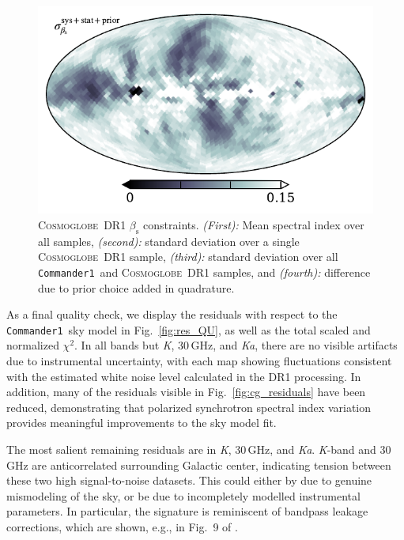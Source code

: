 \documentclass[twocolumn]{../../common/aa}
\def\commanderone{\texttt{Commander1}}
\newcommand{\cosmoglobe}{\textsc{Cosmoglobe}}
\newcommand{\K}[0]{\textit K}
\newcommand{\Ka}[0]{\textit{Ka}}
\begin{document}
\begin{figure}
	\includegraphics[width=\columnwidth]{figures/beta_n0016_sd_stat_inst_prior.pdf}
	\caption{
		\cosmoglobe\ DR1 $\beta_\mathrm s$ constraints. \textit{(First):} Mean spectral index over all samples, \textit{(second):} standard deviation over a single \cosmoglobe\ DR1 sample, \textit{(third):} standard deviation over all \commanderone\ and \cosmoglobe\ DR1 samples, and \textit{(fourth):} difference due to prior choice added in quadrature.}
	\label{fig:beta_16}
\end{figure}



As a final quality check, we display the residuals with respect to the \commanderone\ sky model in Fig.~\ref{fig:res_QU}, as well as the total scaled and normalized $\chi^2$. In all bands but \K, 30\,GHz, and \Ka, there are no visible artifacts due to instrumental uncertainty, with each map showing fluctuations consistent with the estimated white noise level calculated in the DR1 processing.  In addition, many of the residuals visible in Fig.~\ref{fig:cg_residuals} have been reduced, demonstrating that polarized synchrotron spectral index variation provides meaningful improvements to the sky model fit.

The most salient remaining residuals are in \K, 30\,GHz, and \Ka. \K-band and 30\,GHz are anticorrelated surrounding Galactic center, indicating  tension between these two high signal-to-noise datasets. This could either by due to genuine mismodeling of the sky, or be due to incompletely modelled instrumental parameters. In particular, the signature is reminiscent of bandpass leakage corrections, which are shown, e.g., in Fig.~9 of \citet{bp09}.
\end{document}
